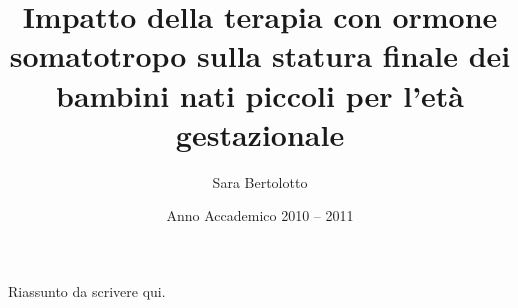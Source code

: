 \documentclass[12pt,a4paper]{article}
\author{Sara Bertolotto}
\title{Impatto della terapia con ormone somatotropo sulla statura finale dei bambini nati piccoli per l'età gestazionale}
\date{Anno Accademico 2010 -- 2011}
\begin{document}
\maketitle
Riassunto da scrivere qui.
\end{document}
